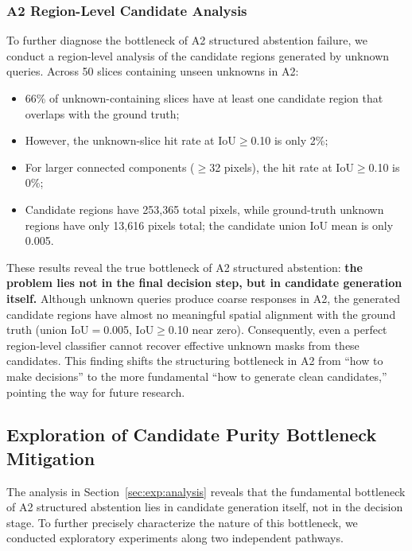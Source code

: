 \documentclass[3p,twocolumn,authoryear]{elsarticle}
\begin{document}
\subsubsection{A2 Region-Level Candidate Analysis}\label{sec:exp:analysis:region}

To further diagnose the bottleneck of A2 structured abstention failure, we conduct
a region-level analysis of the candidate regions generated by unknown queries.
Across 50 slices containing unseen unknowns in A2:

\begin{itemize}[nosep]
  \item 66\% of unknown-containing slices have at least one candidate region that
        overlaps with the ground truth;
  \item However, the unknown-slice hit rate at IoU$\geq$0.10 is only 2\%;
  \item For larger connected components ($\geq$32 pixels), the hit rate at
        IoU$\geq$0.10 is 0\%;
  \item Candidate regions have 253,365 total pixels, while ground-truth unknown
        regions have only 13,616 pixels total; the candidate union IoU mean is only 0.005.
\end{itemize}

These results reveal the true bottleneck of A2 structured abstention:
\textbf{the problem lies not in the final decision step, but in candidate generation
itself.}
Although unknown queries produce coarse responses in A2, the generated candidate regions
have almost no meaningful spatial alignment with the ground truth
(union IoU$=$0.005, IoU$\geq$0.10 near zero).
Consequently, even a perfect region-level classifier cannot recover effective unknown
masks from these candidates.
This finding shifts the structuring bottleneck in A2 from ``how to make decisions''
to the more fundamental ``how to generate clean candidates,''
pointing the way for future research.


\subsection{Exploration of Candidate Purity Bottleneck Mitigation}\label{sec:exp:explore}

The analysis in Section~\ref{sec:exp:analysis} reveals that the fundamental bottleneck
of A2 structured abstention lies in candidate generation itself, not in the decision stage.
To further precisely characterize the nature of this bottleneck, we conducted exploratory
experiments along two independent pathways.
\end{document}
